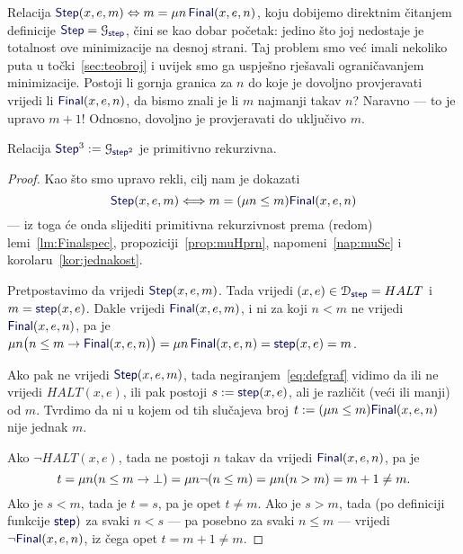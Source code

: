 Relacija $\f{Step}(x,e,m)\Leftrightarrow m= \mu n\,\f{Final}(x,e,n)$, koju dobijemo direktnim čitanjem definicije $\f{Step}=\graf{\f{step}}$, čini se kao dobar početak: jedino što joj nedostaje je totalnost ove minimizacije na desnoj strani. Taj problem smo već imali nekoliko puta u točki~\ref{sec:teobroj} i uvijek smo ga uspješno rješavali ograničavanjem minimizacije. Postoji li gornja granica za $n$ do koje je dovoljno provjeravati vrijedi li $\f{Final}(x,e,n)$, da bismo znali je li $m$ najmanji takav $n$? Naravno --- to je upravo $m+1$! Odnosno, dovoljno je provjeravati do uključivo $m$.

\begin{lema}[{name=[primitivna rekurzivnost grafa brojenja koraka do zaustavljanja]}]
Relacija $\f{Step}^3:=\graf{\f{step}^2}$ je primitivno rekurzivna.
\end{lema}
\begin{proof}
Kao što smo upravo rekli, cilj nam je dokazati
\begin{equation}
    \f{Step}(x,e,m)\Longleftrightarrow m=(\mu n\le m)\f{Final}(x,e,n)
\end{equation}
--- iz toga će onda slijediti primitivna rekurzivnost prema (redom) lemi~\ref{lm:Finalspec}, propoziciji~\ref{prop:muHprn}, napomeni~\ref{nap:muSc} i korolaru~\ref{kor:jednakost}.

Pretpostavimo da vrijedi $\f{Step}(x,e,m)$. Tada vrijedi $(x,e)\in\dom{\f{step}}=HALT$ i $m=\f{step}(x,e)$. Dakle vrijedi $\f{Final}(x,e,m)$, i ni za koji $n<m$ ne vrijedi $\f{Final}(x,e,n)$, pa je $\mu n\bigl(n\le m\to\f{Final}(x,e,n)\bigr)=\mu n\,\f{Final}(x,e,n)=\f{step}(x,e)=m$.

Ako pak ne vrijedi $\f{Step}(x,e,m)$, tada negiranjem~\eqref{eq:defgraf} vidimo da ili ne vrijedi $HALT(x,e)$, ili pak postoji $s:=\f{step}(x,e)$, ali je različit (veći ili manji) od $m$. Tvrdimo da ni u kojem od tih slučajeva broj $t:=(\mu n\le m)\f{Final}(x,e,n)$ nije jednak $m$.

Ako $\lnot HALT(x,e)$, tada ne postoji $n$ takav da vrijedi $\f{Final}(x,e,n)$, pa je
\begin{equation}
    t = \mu n(n\le m\to\bot)=\mu n\lnot(n\le m)=\mu n(n>m)= m+1\ne m\text.
\end{equation}
Ako je $s<m$, tada je $t=s$, pa je opet $t\ne m$. Ako je $s>m$, tada (po definiciji funkcije $\f{step})$ za svaki $n<s$ --- pa posebno za svaki $n\le m$ --- vrijedi $\lnot\f{Final}(x,e,n)$, iz čega opet $t=m+1\ne m$.
\end{proof}

